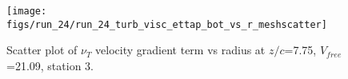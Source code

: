 \begin{figure}[H]
\centering
\texttt{[image: figs/run\_24/run\_24\_turb\_visc\_ettap\_bot\_vs\_r\_meshscatter]}
\caption{Scatter plot of $\nu_T$ velocity gradient term vs radius at $z/c$=7.75, $V_{free}$=21.09, station 3.}
\label{fig:run_24_turb_visc_ettap_bot_vs_r_meshscatter}
\end{figure}


